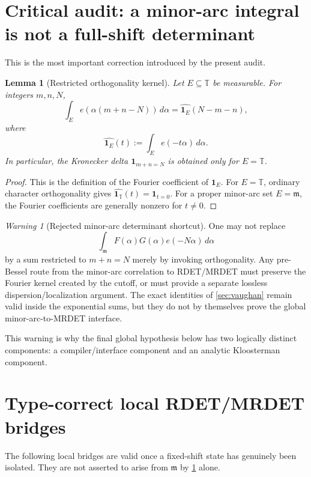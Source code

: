 \documentclass[11pt]{article}
\newtheorem{lemma}[theorem]{Lemma}
\theoremstyle{definition}
\theoremstyle{remark}
\newtheorem{warning}[theorem]{Warning}
\newcommand{\T}{\mathbb T}
\newcommand{\1}{\mathbf 1}
\newcommand{\mcal}{\mathfrak m}
\begin{document}
\section{Critical audit: a minor-arc integral is not a full-shift determinant}\label{sec:minor-audit}

This is the most important correction introduced by the present audit.

\begin{lemma}[Restricted orthogonality kernel]\label{lem:restricted-orth}
Let \(E\subseteq\T\) be measurable.  For integers \(m,n,N\),
\[
 \int_E e(\alpha(m+n-N))\,d\alpha
 =\widehat{\1_E}(N-m-n),
\]
where
\[
 \widehat{\1_E}(t):=\int_E e(-t\alpha)\,d\alpha.
\]
In particular, the Kronecker delta \(\1_{m+n=N}\) is obtained only for \(E=\T\).
\end{lemma}

\begin{proof}
This is the definition of the Fourier coefficient of \(\1_E\).  For \(E=\T\), ordinary character orthogonality gives \(\widehat{\1_\T}(t)=\1_{t=0}\).  For a proper minor-arc set \(E=\mcal\), the Fourier coefficients are generally nonzero for \(t\ne0\).
\end{proof}

\begin{warning}[Rejected minor-arc determinant shortcut]\label{warn:minor-det}
One may not replace
\[
 \int_{\mcal}F(\alpha)G(\alpha)e(-N\alpha)\,d\alpha
\]
by a sum restricted to \(m+n=N\) merely by invoking orthogonality.  Any pre-Bessel route from the minor-arc correlation to RDET/MRDET must preserve the Fourier kernel created by the cutoff, or must provide a separate lossless dispersion/localization argument.  The exact identities of \cref{sec:vaughan} remain valid inside the exponential sums, but they do not by themselves prove the global minor-arc-to-MRDET interface.
\end{warning}

This warning is why the final global hypothesis below has two logically distinct components: a compiler/interface component and an analytic Kloosterman component.

\section{Type-correct local RDET/MRDET bridges}\label{sec:mrdet}

The following local bridges are valid once a fixed-shift state has genuinely been isolated.  They are not asserted to arise from \(\mcal\) by \cref{lem:restricted-orth} alone.
\end{document}
